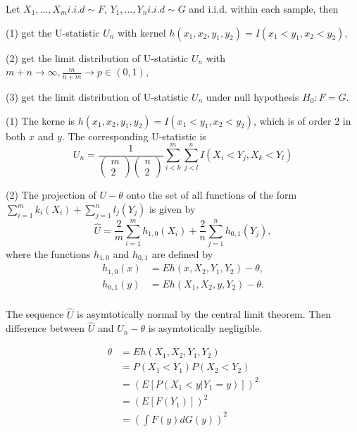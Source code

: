 \begin{problem}
Let $X_1,\ldots,X_m i.i.d\sim F$, $Y_1,\ldots,Y_n i.i.d \sim G$ and i.i.d. within each sample, then

(1) get the U-statistic $U_n$ with kernel $h(x_1,x_2,y_1,y_2)=I(x_1<y_1,x_2<y_2)$,

(2) get the limit distribution of U-statistic $U_n$ with $m+n\rightarrow\infty, \frac{m}{n+m}\rightarrow p\in (0,1)$,

(3) get the limit distribution of U-statistic $U_n$ under null hypothesis $H_0:F=G$.

\end{problem}


\begin{solution}
(1) The kerne is $h(x_1,x_2,y_1,y_2)=I(x_1<y_1,x_2<y_2)$, which is of order 2 in both $x$ and $y$. The corresponding U-statistic is
\begin{equation*}
    U_n=\frac{1}{\left( \begin{matrix} m \\ 2 \end{matrix} \right) \left( \begin{matrix} n \\ 2 \end{matrix} \right)} \sum_{i<k}^m \sum_{j<l}^n  I(X_i<Y_j,X_k<Y_l)
\end{equation*}

(2) The projection of $U-\theta$ onto the set of all functions of the form $\sum_{i=1}^m k_i (X_i) + \sum_{j=1}^n l_j(Y_j)$ is given by 
\begin{equation*}
    \hat{U} = \frac{2}{m} \sum_{i=1}^m h_{1,0} (X_i) + \frac{2}{n} \sum_{j=1}^n h_{0,1} (Y_j),
\end{equation*}
where the functions $h_{1,0}$ and $h_{0,1}$ are defined by
\begin{equation*}
    \begin{split}
        h_{1,0}(x) & = Eh(x,X_2,Y_1,Y_2) - \theta, \\
        h_{0,1}(y) & = Eh(X_1,X_2,y,Y_2) - \theta. \\
    \end{split}
\end{equation*}

The sequence $\hat{U}$ is asymtotically normal by the central limit theorem. Then difference between $\hat{U}$ and $U_n-\theta$ is asymtotically negligible. 

\begin{equation*}
    \begin{split}
        \theta & = Eh(X_1, X_2, Y_1, Y_2)  \\
        & =  P(X_1 <Y_1)P(X_2<Y_2) \\
        & = (E [P(X_1 < y | Y_1 = y)] )^2 \\
        & =  (E [F(Y_1)])^2 \\
        & = \left(\int F(y) d G(y) \right)^2
    \end{split}
\end{equation*}


\end{solution}
